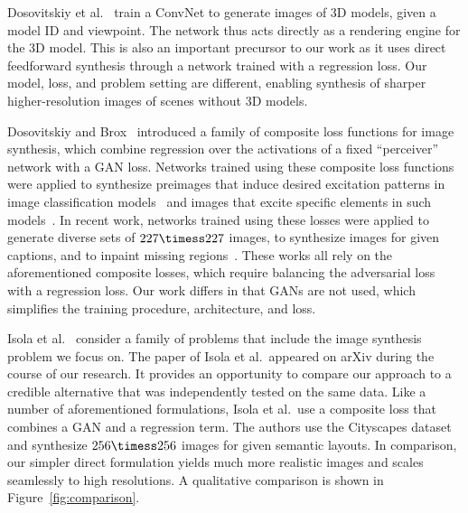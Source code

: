 Dosovitskiy et al.~\cite{Dosovitskiy2016} train a ConvNet to generate images of 3D models, given a model ID and viewpoint. The network thus acts directly as a rendering engine for the 3D model. This is also an important precursor to our work as it uses direct feedforward synthesis through a network trained with a regression loss. Our model, loss, and problem setting are different, enabling synthesis of sharper higher-resolution images of scenes without 3D models.

Dosovitskiy and Brox~\cite{DosovitskiyBrox2016} introduced a family of composite loss functions for image synthesis, which combine regression over the activations of a fixed ``perceiver'' network with a GAN loss. Networks trained using these composite loss functions were applied to synthesize preimages that induce desired excitation patterns in image classification models~\cite{DosovitskiyBrox2016} and images that excite specific elements in such models~\cite{Nguyen2016}. In recent work, networks trained using these losses were applied to generate diverse sets of $227\timess 227$ images, to synthesize images for given captions, and to inpaint missing regions~\cite{Nguyen2017}. These works all rely on the aforementioned composite losses, which require balancing the adversarial loss with a regression loss. Our work differs in that GANs are not used, which simplifies the training procedure, architecture, and loss.

Isola et al.~\cite{Isola2017} consider a family of problems that include the image synthesis problem we focus on. The paper of Isola et al.~appeared on arXiv during the course of our research.
It provides an opportunity to compare our approach to a credible alternative that was independently tested on the same data. Like a number of aforementioned formulations, Isola et al.~use a composite loss that combines a GAN and a regression term.
The authors use the Cityscapes dataset and synthesize $256\timess 256$ images for given semantic layouts.
In comparison, our simpler direct formulation yields much more realistic images and scales seamlessly to high resolutions.
A qualitative comparison is shown in Figure~\ref{fig:comparison}.

